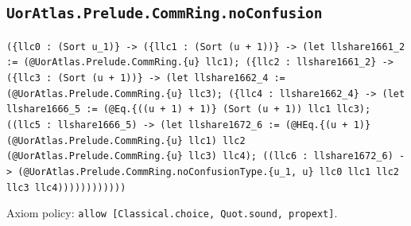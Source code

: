 \documentclass[11pt]{article}
\begin{document}
\subsection*{\texttt{UorAtlas.Prelude.CommRing.noConfusion}}
\noindent\texttt{(\{llc0 : (Sort u\_1)\} -> (\{llc1 : (Sort (u + 1))\} -> (let llshare1661\_2 := (@UorAtlas.Prelude.CommRing.\{u\} llc1); (\{llc2 : llshare1661\_2\} -> (\{llc3 : (Sort (u + 1))\} -> (let llshare1662\_4 := (@UorAtlas.Prelude.CommRing.\{u\} llc3); (\{llc4 : llshare1662\_4\} -> (let llshare1666\_5 := (@Eq.\{((u + 1) + 1)\} (Sort (u + 1)) llc1 llc3); ((llc5 : llshare1666\_5) -> (let llshare1672\_6 := (@HEq.\{(u + 1)\} (@UorAtlas.Prelude.CommRing.\{u\} llc1) llc2 (@UorAtlas.Prelude.CommRing.\{u\} llc3) llc4); ((llc6 : llshare1672\_6) -> (@UorAtlas.Prelude.CommRing.noConfusionType.\{u\_1, u\} llc0 llc1 llc2 llc3 llc4))))))))))))}\par
\noindent Axiom policy: \texttt{allow [Classical.choice, Quot.sound, propext]}.\par
\end{document}

